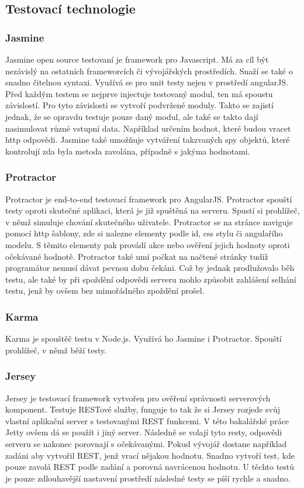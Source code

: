 \documentclass[czech,master,public,dept460,male,cpdeclaration,twoside]{diploma}
\begin{document}
\subsection{Testovací technologie}
\subsubsection{Jasmine}
Jasmine open source testovaní je framework pro Javascript. Má za cíl být nezávislý na ostatních frameworcích či vývojářských prostředích. Snaží se také o snadno čitelnou syntaxi. Využívá se pro unit testy nejen v prostředí angularJS. Před každým testem se nejprve injectuje testovaný modul, ten má spoustu závislostí. Pro tyto závislosti se vytvoří podvržené moduly. Takto se zajistí jednak, že se opravdu testuje pouze daný modul, ale také se takto dají nasimulovat různé vstupní data. Například určením hodnot, které budou vracet http odpovědi. Jasmine také umožňuje vytváření takzvaných spy objektů, které kontrolují zda byla metoda zavolána, případně s jakýma hodnotami.

\subsubsection{Protractor}
Protractor je end-to-end testovací framework pro AngularJS. Protractor spouští testy oproti skutečné aplikaci, která je již spuštěná na serveru. Spustí si prohlížeč, v němž simuluje chování skutečného uživatele. Protractor se na stránce naviguje pomocí http šablony, zde si nalezne elementy podle id, css stylu či angulařího modelu. S těmito elementy pak provádí akce nebo ověření jejich hodnoty oproti očekávané hodnotě. Protractor také umí počkat na načtené stránky tudíž programátor nemusí dávat pevnou dobu čekáni. Což by jednak prodlužovalo běh testu, ale také by při spoždění odpovědi serveru mohlo způsobit zahlášení selhání testu, jenž by ovšem bez mimořádného zpoždění prošel. \cite{TestingAngularApp}

\subsubsection{Karma}
Karma je spouštěč testu v Node.js. Využívá ho Jasmine i Protractor. Spouští prohlížeč, v němž běží testy.

\subsubsection{Jersey}
Jersey je testovací framework vytvořen pro ověření správnosti serverových komponent. Testuje RESTové služby, funguje to tak že si Jersey rozjede svůj vlastní aplikační server s testovanými REST funkcemi. V této bakalářské práce Jetty ovšem dá se použít i jiný server. Následně se volají tyto resty, odpovědi serveru se nakonec porovnají s očekávanými. Pokud vývojář dostane například zadáni aby vytvořil REST, jenž vrací nějakou hodnotu. Snadno vytvoří test, kde pouze zavolá REST podle zadání a porovná navrácenou hodnotu. U těchto testů je pouze zdlouhavější nastavení prostředí následné testy se píší rychle a snadno.
\end{document}
